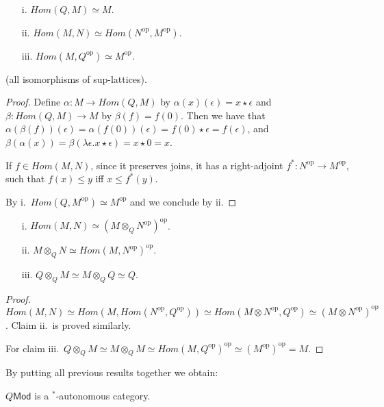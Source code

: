 \begin{proposition}
\begin{itemize}
\item[i.] $Hom(Q,M)\simeq M$.
\item[ii.] $Hom(M,N)\simeq Hom(N^{\mathrm{op}},M^{\mathrm{op}})$.
\item[iii.] $Hom(M, Q^{\mathrm{op}})\simeq M^{\mathrm{op}}$.
\end{itemize}
(all isomorphisms of sup-lattices).
\end{proposition}
\begin{proof}
Define $\alpha:M\to Hom(Q,M)$ by $\alpha(x)(\epsilon)=x\star\epsilon$ and 
$\beta:Hom(Q,M)\to M$ by $\beta(f)=f(0)$. Then we have that 
$\alpha(\beta(f))(\epsilon)=\alpha(f(0))(\epsilon)=f(0)\star\epsilon=f(\epsilon)$, and 
$\beta(\alpha(x))=\beta(\lambda \epsilon.x\star\epsilon)=x\star0=x$.

If $f\in Hom(M,N)$, since it preserves joins, it has a right-adjoint $f^{*}:N^{\mathrm{op}}\to M^{\mathrm{op}}$, such that $f(x)\leq y$ iff $x\leq f^{*}(y)$. 


By i.~$Hom(Q,M^{\mathrm{op}})\simeq M^{\mathrm{op}}$ and we conclude by ii.
\end{proof}

\begin{proposition}
\begin{itemize}
\item[i.] $Hom(M,N)\simeq (M\otimes_{Q}N^{\mathrm{op}})^{\mathrm{op}}$.
\item[ii.] $M\otimes_{Q}N\simeq Hom(M, N^{\mathrm{op}})^{\mathrm{op}}$.
\item[iii.] $Q\otimes_{Q} M \simeq M\otimes_{Q}Q\simeq Q$.
\end{itemize}
\end{proposition}
\begin{proof}
$Hom(M,N)\simeq Hom(M, Hom(N^{\mathrm{op}},Q^{\mathrm{op}}))
\simeq Hom(M\otimes N^{\mathrm{op}},Q^{\mathrm{op}})\simeq
(M\otimes N^{\mathrm{op}})^{\mathrm{op}}$.
Claim ii.~is proved similarly.

For claim iii.~$Q\otimes_{Q}M\simeq M\otimes_{Q}M\simeq Hom(M, Q^{\mathrm{op}})^{\mathrm{op}}\simeq (M^{\mathrm{op}})^{\mathrm{op}}=M$. 
\end{proof}


By putting all previous results together we obtain:
\begin{theorem}
$Q\mathsf{Mod}$ is a $^{*}$-autonomous category.
\end{theorem}




